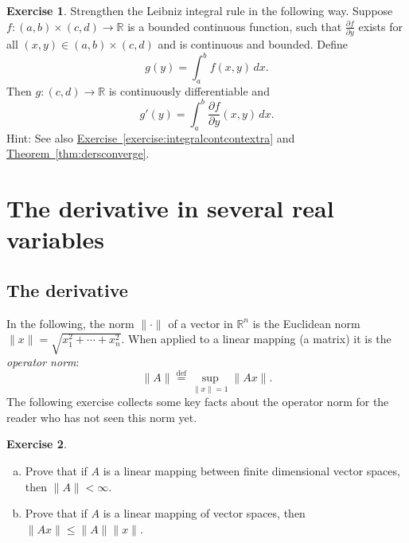 \documentclass[12pt,openany]{book}
\newcommand{\snorm}[1]{\lVert {#1} \rVert}
\newcommand{\R}{{\mathbb{R}}}
\newcommand{\myindex}[1]{#1\index{#1}}
\theoremstyle{plain}
\theoremstyle{remark}
\theoremstyle{definition}
\newenvironment{exbox}{%
    \def\FrameCommand{\vrule width 1pt \relax\hspace{10pt}}%
    \MakeFramed{\advance\hsize-\width\FrameRestore}%
}{%
    \endMakeFramed
}
\newenvironment{exparts}{%
    \leavevmode\begin{enumerate}[a),noitemsep,topsep=0pt,parsep=0pt,partopsep=0pt]
}{%
    \end{enumerate}
}
\theoremstyle{exercise}
\newtheorem{exercise}{Exercise}[section]
\theoremstyle{example}
\newcommand{\exerciseref}[1]{\hyperref[#1]{Exercise~\ref*{#1}}}
\newcommand{\thmref}[1]{\hyperref[#1]{Theorem~\ref*{#1}}}
\begin{document}
\begin{exbox}
\begin{samepage}
\begin{exercise} \label{exercise:strongerleibniz}
Strengthen the Leibniz integral rule in the following way.
Suppose $f \colon (a,b) \times (c,d) \to \R$ is a bounded continuous function,
such that $\frac{\partial f}{\partial y}$ exists for all $(x,y) \in (a,b)
\times (c,d)$ and is continuous and bounded.  Define
\begin{equation*}
g(y) = \int_a^b f(x,y) \,dx .
\end{equation*}
Then $g \colon (c,d) \to \R$ is continuously differentiable and
\begin{equation*}
g'(y) = \int_a^b \frac{\partial f}{\partial y}(x,y) \,dx .
\end{equation*}
Hint: See also \exerciseref{exercise:integralcontcontextra} and
\thmref{thm:dersconverge}.
\end{exercise}
\end{samepage}
\end{exbox}


\section{The derivative in several real variables} \label{sec:derinsv}

\subsection{The derivative}

In the following, the norm $\snorm{\cdot}$ of a vector in $\R^n$
is the Euclidean norm $\snorm{x} = \sqrt{x_1^2+\cdots+x_n^2}$.
When applied to a linear mapping (a matrix) it is the
\emph{\myindex{operator norm}}:
\begin{equation*}
\snorm{A} \overset{\text{def}}{=} \sup_{\snorm{x} = 1} \snorm{Ax} .
\end{equation*}
The following exercise collects some key facts about the operator norm
for the reader who has not seen this norm yet.

\begin{exbox}
\begin{exercise}
\begin{exparts} 
\item
Prove that if $A$ is a linear mapping between finite dimensional vector
spaces, then $\snorm{A} < \infty$.
\item
Prove that if $A$ is a linear mapping of vector spaces, then
$\snorm{Ax} \leq \snorm{A} \snorm{x}$.
\end{exparts} 
\end{exercise}
\end{exbox}
\end{document}
